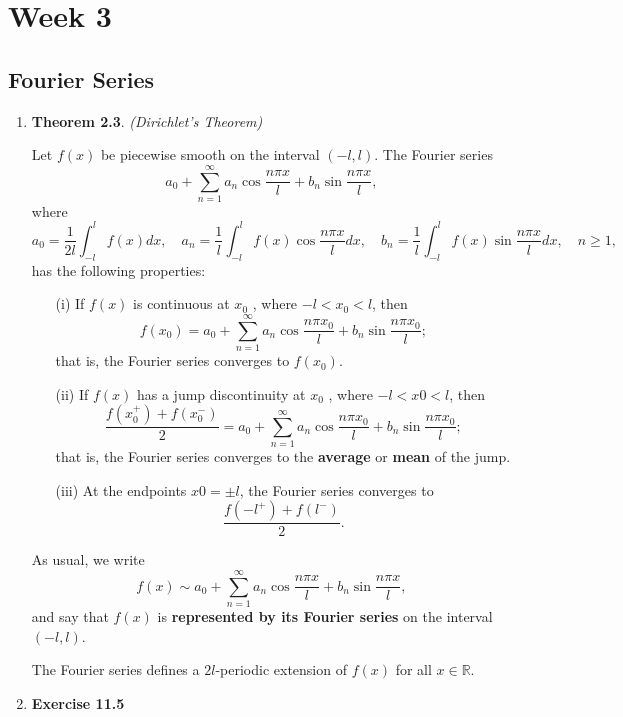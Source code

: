 \chapter{Week 3}
\setcounter{weekpage}{1}
\thispagestyle{plainweek}

\section{Fourier Series}

\begin{enumerate}




\item \textbf{Theorem 2.3}. \textit{(Dirichlet's Theorem)}

Let $f (x)$ be piecewise smooth on the interval $(−l, l)$. The Fourier series 
\[a_{0}+\sum_{n=1}^{\infty}a_{n}\cos \frac{n\pi x}{l} + b_{n}\sin \frac{n\pi x}{l},\]
where
\[a_{0} = \frac{1}{2l}\int_{-l}^{l}f(x)dx, \quad a_{n} = \frac{1}{l}\int_{-l}^{l}f(x)\cos\frac{n\pi x}{l}dx,\quad b_{n} = \frac{1}{l}\int_{-l}^{l}f(x)\sin\frac{n\pi x}{l}dx,\quad n\geq 1,\]
has the following properties:
\begin{itemize}

\item[(i)] If $f (x)$ is continuous at $x _{0}$ , where $-l < x _{0} < l$, then
\[f(x_{0})=a_{0}+\sum_{n=1}^{\infty}a_{n}\cos \frac{n\pi x_{0}}{l} + b_{n}\sin \frac{n\pi x_{0}}{l};\]
that is, the Fourier series converges to $f (x _{0} )$.
\item[(ii)] If $f (x)$ has a jump discontinuity at $x _{0}$ , where $−l < x 0 < l$, then
\[\frac{f(x_{0}^{+})+f(x_{0}^{-})}{2} = a_{0}+\sum_{n=1}^{\infty}a_{n}\cos \frac{n\pi x_{0}}{l} + b_{n}\sin \frac{n\pi x_{0}}{l};\]
that is, the Fourier series converges to the \textbf{average} or \textbf{mean} of the jump.
\item[(iii)] At the endpoints $x 0 = \pm l$, the Fourier series converges to
\[\frac{f(-l^{+})+f(l^{-})}{2}.\]
\end{itemize}
As usual, we write
\[f(x)\sim a_{0}+\sum_{n=1}^{\infty}a_{n}\cos \frac{n\pi x}{l} + b_{n}\sin \frac{n\pi x}{l},\]
and say that $f (x)$ is \textbf{represented by its Fourier series} on the interval $(−l, l)$.



The Fourier series defines a $2l$-periodic extension of $f(x)$ for all $x\in \mathbb{R}$.

\newpage


\item \textbf{Exercise 11.5} 


\end{enumerate}
